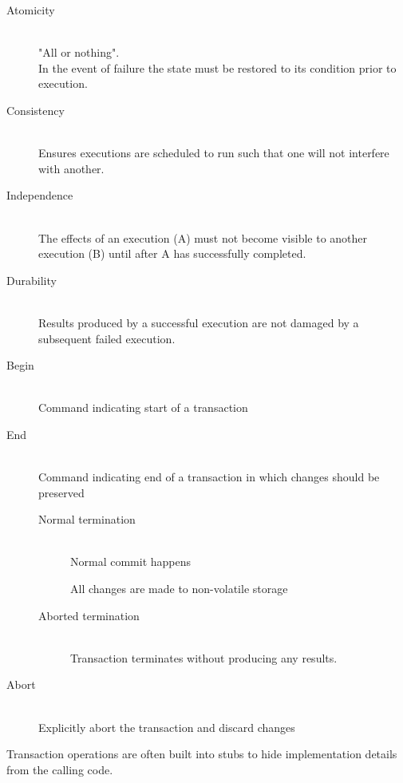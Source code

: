 \documentclass[a4paper]{article}
\begin{document}
\begin{description}
  \item[Atomicity] \hfill \\
    "All or nothing". \\
    In the event of failure the state must be restored to its condition prior to
    execution.
  \item[Consistency] \hfill \\
    Ensures executions are scheduled to run such that one will not interfere
    with another.
  \item[Independence] \hfill \\
    The effects of an execution (A) must not become visible to another execution
    (B) until after A has successfully completed.
  \item[Durability] \hfill \\
    Results produced by a successful execution are not damaged by a subsequent
    failed execution.
\end{description}


\begin{description}
  \item[Begin] \hfill \\
    Command indicating start of a transaction

  \item[End] \hfill \\
    Command indicating end of a transaction in which changes should be preserved
    \begin{description}
      \item[Normal termination] \hfill \\
        Normal commit happens

        All changes are made to non-volatile storage

      \item[Aborted termination] \hfill \\
        Transaction terminates without producing any results.

    \end{description}

  \item[Abort] \hfill \\
    Explicitly abort the transaction and discard changes
\end{description}

Transaction operations are often built into stubs to hide implementation details
from the calling code.
\end{document}
